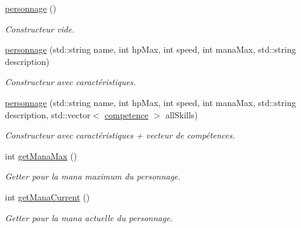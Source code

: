 \begin{DoxyCompactItemize}
\item 
\hyperlink{classpersonnage_acd9ca516f8c5c110687e5167dab8db59}{personnage} ()
\begin{DoxyCompactList}\small\item\em Constructeur vide. \end{DoxyCompactList}\item 
\mbox{\label{classpersonnage_a76ed1134fdaa1dd324e5ee8268a2ab1d}} 
\hyperlink{classpersonnage_a76ed1134fdaa1dd324e5ee8268a2ab1d}{personnage} (std\+::string name, int hp\+Max, int speed, int mana\+Max, std\+::string description)
\begin{DoxyCompactList}\small\item\em Constructeur avec caractéristiques. \end{DoxyCompactList}\item 
\mbox{\label{classpersonnage_ab439cf333698805523acff6e1b870c0e}} 
\hyperlink{classpersonnage_ab439cf333698805523acff6e1b870c0e}{personnage} (std\+::string name, int hp\+Max, int speed, int mana\+Max, std\+::string description, std\+::vector$<$ \hyperlink{classcompetence}{competence} $>$ all\+Skills)
\begin{DoxyCompactList}\small\item\em Constructeur avec caractéristiques + vecteur de compétences. \end{DoxyCompactList}\item 
\mbox{\label{classpersonnage_ad7e16ec80e6339309f1acc579b8108e1}} 
int \hyperlink{classpersonnage_ad7e16ec80e6339309f1acc579b8108e1}{get\+Mana\+Max} ()
\begin{DoxyCompactList}\small\item\em Getter pour la mana maximum du personnage. \end{DoxyCompactList}\item 
\mbox{\label{classpersonnage_a0a1c3d6ae4ffad103cb5ecf9f97b83a3}} 
int \hyperlink{classpersonnage_a0a1c3d6ae4ffad103cb5ecf9f97b83a3}{get\+Mana\+Current} ()
\begin{DoxyCompactList}\small\item\em Getter pour la mana actuelle du personnage. \end{DoxyCompactList}\item 

\end{DoxyCompactItemize}

